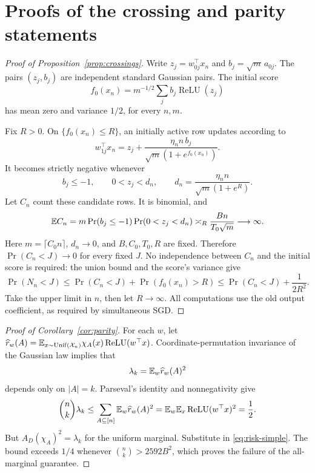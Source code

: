 \documentclass[11pt,letterpaper,pmlr,twoside]{jmlr}
\newcommand{\X}{\mathcal X}\newcommand{\Hc}{\mathcal H}
\newcommand{\relu}{\operatorname{ReLU}}\newcommand{\dc}{\operatorname{dc}}
\begin{document}
\section{Proofs of the crossing and parity statements}
\label{app:consequences}
\begin{proof}[Proof of Proposition~\ref{prop:crossings}]
Write $z_j=w_{0j}^\top x_n$ and $b_j=\sqrt m\,a_{0j}$. The pairs $(z_j,b_j)$ are independent standard Gaussian pairs. The initial score
\[
 f_0(x_n)=m^{-1/2}\sum_j b_j\relu(z_j)
\]
has mean zero and variance $1/2$, for every $n,m$.

Fix $R>0$. On $\{f_0(x_n)\le R\}$, an initially active row updates according to
\[
 w_{1j}^\top x_n=z_j+\frac{\eta_n n\,b_j}{\sqrt m(1+e^{f_0(x_n)})}.
\]
It becomes strictly negative whenever
\[
 b_j\le-1,\qquad 0<z_j<d_n,
 \qquad d_n=\frac{\eta_n n}{\sqrt m(1+e^R)}.
\]
Let $C_n$ count these candidate rows. It is binomial, and
\[
 \mathbb E C_n=m\Pr(b_j\le-1)\Pr(0<z_j<d_n)
 \asymp_R\frac{B n}{T_0\sqrt m}\longrightarrow\infty.
\]
Here $m=\lceil C_0n\rceil$, $d_n\to0$, and $B,C_0,T_0,R$ are fixed. Therefore $\Pr(C_n<J)\to0$ for every fixed $J$. No independence between $C_n$ and the initial score is required: the union bound and the score's variance give
\[
 \Pr(N_n<J)\le\Pr(C_n<J)+\Pr(f_0(x_n)>R)
 \le\Pr(C_n<J)+\frac1{2R^2}.
\]
Take the upper limit in $n$, then let $R\to\infty$. All computations use the old output coefficient, as required by simultaneous SGD.
\end{proof}

\begin{proof}[Proof of Corollary~\ref{cor:parity}]
For each $w$, let $\widehat r_w(A)=\E_{x\sim\Unif(\X_n)}\chi_A(x)\relu(w^\top x)$. Coordinate-permutation invariance of the Gaussian law implies that
\[
 \lambda_k=\mathbb E_w\widehat r_w(A)^2
\]
depends only on $|A|=k$. Parseval's identity and nonnegativity give
\[
 \binom nk\lambda_k
 \le\sum_{A\subseteq[n]}\E_w\widehat r_w(A)^2
 =\E_w\E_x\relu(w^\top x)^2=\frac12.
\]
But $A_D(\chi_A)^2=\lambda_k$ for the uniform marginal. Substitute in \eqref{eq:risk-simple}. The bound exceeds $1/4$ whenever $\binom nk>2592B^2$, which proves the failure of the all-marginal guarantee.
\end{proof}
\end{document}
